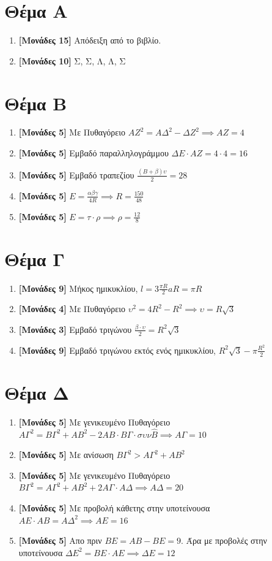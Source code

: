 \documentclass[12pt]{article}
\begin{document}
\section*{Θέμα Α}
  \noindent
  \begin{enumerate}
    \item \textbf{[Μονάδες 15]} Απόδειξη από το βιβλίο.
    \item \textbf{[Μονάδες 10]} Σ, Σ, Λ, Λ, Σ
  \end{enumerate}

\section*{Θέμα Β}
  \noindent
  \begin{enumerate}
    \item \textbf{[Μονάδες 5]} Με Πυθαγόρειο $ΑΖ^2=ΑΔ^2-ΔΖ^2 \implies ΑΖ=4$
    \item \textbf{[Μονάδες 5]} Εμβαδό παραλληλογράμμου $ΔΕ\cdot ΑΖ=4 \cdot 4=16$
    \item \textbf{[Μονάδες 5]} Εμβαδό τραπεζίου $\frac{(Β+β)υ}{2}=28$
    \item \textbf{[Μονάδες 5]} $Ε=\frac{αβγ}{4R} \implies R=\frac{150}{48}$
    \item \textbf{[Μονάδες 5]} $Ε=τ\cdot ρ \implies ρ=\frac{12}{8}$
  \end{enumerate}

\section*{Θέμα Γ}
  \noindent
    \begin{enumerate}
    \item \textbf{[Μονάδες 9]} Μήκος ημικυκλίου, $l=3\frac{\pi R}{2}aR=\pi R$
    \item \textbf{[Μονάδες 4]} Με Πυθαγόρειο $υ^2=4R^2-R^2 \implies υ=R \sqrt{3}$
    \item \textbf{[Μονάδες 3]} Εμβαδό τριγώνου $\frac{β\cdot υ}{2}=R^2 \sqrt{3}$
    \item \textbf{[Μονάδες 9]} Εμβαδό τριγώνου εκτός ενός ημικυκλίου, $R^2 \sqrt{3} - \pi \frac{R^2}{2}$
  \end{enumerate}

\section*{Θέμα Δ}
  \noindent
  \begin{enumerate}
    \item \textbf{[Μονάδες 5]} Με γενικευμένο Πυθαγόρειο $ΑΓ^2=ΒΓ^2+ΑΒ^2-2ΑΒ\cdot ΒΓ \cdot συν\hat{Β} \implies ΑΓ=10$
    \item \textbf{[Μονάδες 5]} Με ανίσωση $ΒΓ^2>ΑΓ^2+ΑΒ^2$
    \item \textbf{[Μονάδες 5]} Με γενικευμένο Πυθαγόρειο $ΒΓ^2=ΑΓ^2+ΑΒ^2+2ΑΓ\cdot ΑΔ \implies ΑΔ=20$
    \item \textbf{[Μονάδες 5]} Με προβολή κάθετης στην υποτείνουσα $ΑΕ \cdot ΑΒ = ΑΔ^2 \implies ΑΕ=16$
    \item \textbf{[Μονάδες 5]} Απο πριν $ΒΕ=ΑΒ-ΒΕ=9$. Άρα με προβολές στην υποτείνουσα $ΔΕ^2=ΒΕ\cdot ΑΕ \implies ΔΕ=12$
  \end{enumerate}
\end{document}
